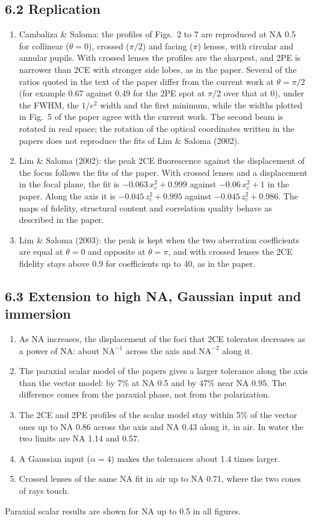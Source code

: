 \documentclass[10pt]{article}
\begin{document}
\subsection*{6.2 Replication}
\begin{enumerate}
\item Cambaliza \& Saloma: the profiles of Figs.~2 to 7 are reproduced at NA 0.5 for collinear ($\theta = 0$),
crossed ($\pi/2$) and facing ($\pi$) lenses, with circular and annular pupils. With crossed lenses the profiles
are the sharpest, and 2PE is narrower than 2CE with stronger side lobes, as in the paper. Several of the ratios
quoted in the text of the paper differ from the current work at $\theta = \pi/2$ (for example 0.67 against 0.49
for the 2PE spot at $\pi/2$ over that at 0), under the FWHM, the $1/e^2$ width and the first minimum, while the
widths plotted in Fig.~5 of the paper agree with the current work. The second beam is rotated in real space; the
rotation of the optical coordinates written in the papers does not reproduce the fits of Lim \& Saloma (2002).
\item Lim \& Saloma (2002): the peak 2CE fluorescence against the displacement of the focus follows the fits of the
paper. With crossed lenses and a displacement in the focal plane, the fit is $-0.063\,x_c^2 + 0.999$ against
$-0.06\,x_c^2 + 1$ in the paper. Along the axis it is $-0.045\,z_c^2 + 0.995$ against $-0.045\,z_c^2 + 0.986$.
The maps of fidelity, structural content and correlation quality behave as described in the paper.
\item Lim \& Saloma (2003): the peak is kept when the two aberration coefficients are equal at $\theta = 0$ and
opposite at $\theta = \pi$, and with crossed lenses the 2CE fidelity stays above 0.9 for coefficients up to 40, as
in the paper.
\end{enumerate}

\subsection*{6.3 Extension to high NA, Gaussian input and immersion}
\begin{enumerate}
\item As NA increases, the displacement of the foci that 2CE tolerates decreases as a power of NA: about
$\mathrm{NA}^{-1}$ across the axis and $\mathrm{NA}^{-2}$ along it.
\item The paraxial scalar model of the papers gives a larger tolerance along the axis than the vector model: by 7\%
at NA 0.5 and by 47\% near NA 0.95. The difference comes from the paraxial phase, not from the polarization.
\item The 2CE and 2PE profiles of the scalar model stay within 5\% of the vector ones up to NA 0.86 across the axis
and NA 0.43 along it, in air. In water the two limits are NA 1.14 and 0.57.
\item A Gaussian input ($\alpha = 4$) makes the tolerances about 1.4 times larger.
\item Crossed lenses of the same NA fit in air up to NA 0.71, where the two cones of rays touch.
\end{enumerate}
Paraxial scalar results are shown for NA up to 0.5 in all figures.
\end{document}
